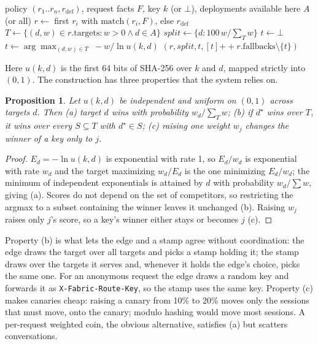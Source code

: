 \documentclass[conference,letterpaper]{IEEEtran}
\newcommand{\code}[1]{\texttt{\small #1}}
\newtheorem{proposition}{Proposition}
\begin{document}
\begin{algorithm}[t]
\caption{Policy decision \textsc{Decide} (pure; shared by simulate, stamp and edge)}
\label{alg:split}
\small
\begin{algorithmic}[1]
\Require policy $(r_1..r_n, r_\mathrm{def})$, request facts $F$, key $k$ (or $\bot$),
deployments available here $A$ (or all)
\State $r \gets$ first $r_i$ with $\mathrm{match}(r_i, F)$, else $r_\mathrm{def}$
\State $T \gets \{(d, w) \in r.\mathrm{targets} : w > 0 \wedge d \in A\}$
\State $\mathit{split} \gets \{ d : 100\,w / \textstyle\sum_{T} w \}$ 
 \State $t \gets \bot$ 
\Else
  \State $t \gets \arg\max_{(d,w)\in T} \; -w / \ln u(k, d)$ 
\EndIf
\State \Return $(r, \mathit{split}, t, [t] \mathbin{+\!\!+} r.\mathrm{fallbacks} \setminus \{t\})$
\end{algorithmic}
\end{algorithm}

Here $u(k,d)$ is the first 64 bits of SHA-256 over $k$ and $d$, mapped strictly into $(0,1)$.
The construction has three properties that the system relies on.

\begin{proposition}
\label{prop:split}
Let $u(k,d)$ be independent and uniform on $(0,1)$ across targets $d$. Then (a) target $d$
wins with probability $w_d / \sum_{T} w$; (b) if $d^\star$ wins over $T$, it wins over every
$S \subseteq T$ with $d^\star \in S$; (c) raising one weight $w_j$ changes the winner of a key
only to $j$.
\end{proposition}
\begin{proof}
$E_d = -\ln u(k,d)$ is exponential with rate 1, so $E_d/w_d$ is exponential with rate $w_d$
and the target maximizing $w_d/E_d$ is the one minimizing $E_d/w_d$; the minimum of
independent exponentials is attained by $d$ with probability $w_d/\sum w$, giving (a). Scores
do not depend on the set of competitors, so restricting the argmax to a subset containing the
winner leaves it unchanged (b). Raising $w_j$ raises only $j$'s score, so a key's winner either
stays or becomes $j$ (c).
\end{proof}

Property (b) is what lets the edge and a stamp agree without coordination: the edge draws the
target over all targets and picks a stamp holding it; the stamp draws over the targets it
serves and, whenever it holds the edge's choice, picks the same one. For an anonymous request
the edge draws a random key and forwards it as \code{X-Fabric-Route-Key}, so the stamp uses
the same key. Property (c) makes canaries cheap: raising a canary from 10\% to 20\% moves only
the sessions that must move, onto the canary; modulo hashing would move most sessions. A
per-request weighted coin, the obvious alternative, satisfies (a) but scatters conversations.
\end{document}
